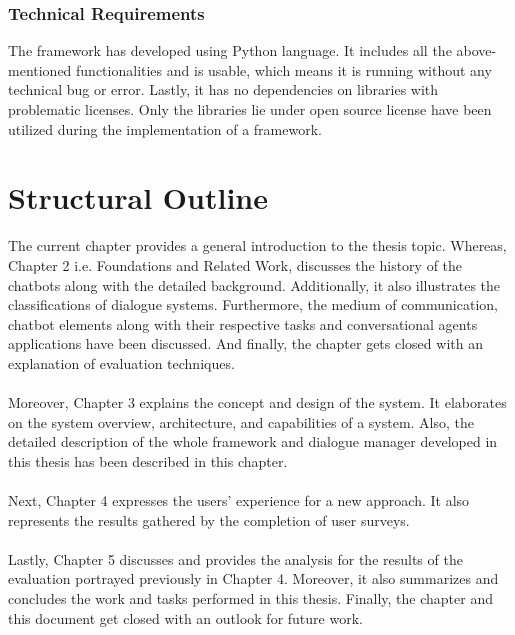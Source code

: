 \subsubsection*{Technical Requirements}
The framework has developed using Python language. It includes all the above-mentioned functionalities and is usable, which means it is running without any technical bug or error. Lastly, it has no dependencies on libraries with problematic licenses. Only the libraries lie under open source license have been utilized during the implementation of a framework.

\section{Structural Outline}
The current chapter provides a general introduction to the thesis topic. Whereas, Chapter 2 i.e. Foundations and Related Work, discusses the history of the chatbots along with the detailed background. Additionally, it also illustrates the classifications of dialogue systems. Furthermore, the medium of communication, chatbot elements along with their respective tasks and conversational agents applications have been discussed. And finally, the chapter gets closed with an explanation of evaluation techniques. 
\\~\\
Moreover, Chapter 3 explains the concept and design of the system. It elaborates on the system overview, architecture, and capabilities of a system. Also, the detailed description of the whole framework and dialogue manager developed in this thesis has been described in this chapter.
\\~\\
Next, Chapter 4 expresses the users' experience for a new approach. It also represents the results gathered by the completion of user surveys.
\\~\\
Lastly, Chapter 5 discusses and provides the analysis for the results of the evaluation portrayed previously in Chapter 4. Moreover, it also summarizes and concludes the work and tasks performed in this thesis. Finally, the chapter and this document get closed with an outlook for future work.